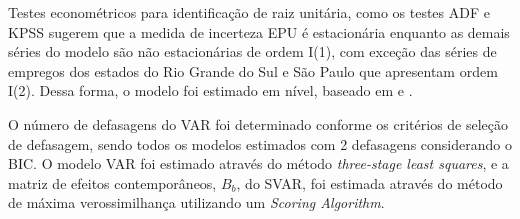 Testes econométricos para identificação de raiz unitária, como os testes \gls{ADF} e \gls{KPSS} sugerem que a medida de incerteza \gls{EPU} é estacionária enquanto as demais séries do modelo são não estacionárias de ordem I(1), com exceção das séries de empregos dos estados do Rio Grande do Sul e São Paulo que apresentam ordem I(2). 
Dessa forma, o modelo foi estimado em nível, baseado em  e .
\par

O número de defasagens do \gls{VAR} foi determinado conforme os critérios de seleção de defasagem, sendo todos os modelos estimados com 2 defasagens considerando o \gls{BIC}. O modelo \gls{VAR} foi estimado através do método \textit{three-stage least squares}, e a matriz de efeitos contemporâneos, $B_{b}$, do \gls{SVAR}, foi estimada através do método de máxima verossimilhança utilizando um \textit{Scoring Algorithm}. 
\par

